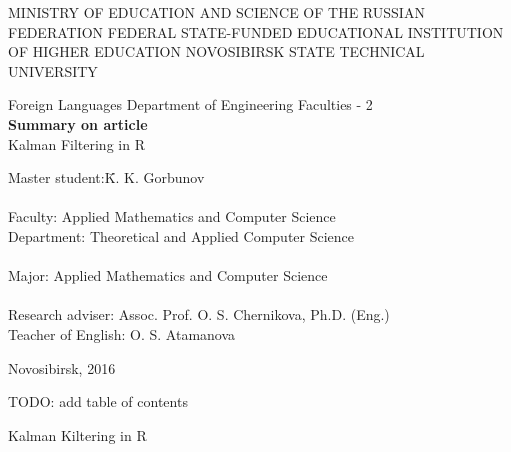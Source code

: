 \documentclass[a4paper,14pt]{extarticle}
\begin{document}
\setcounter{secnumdepth}{0}

\begin{titlepage}

	\begin{center}
		\MakeTextUppercase{ministry of education and science of the russian
			federation}
		\bigbreak
		\MakeTextUppercase{federal state-funded educational institution of higher
			education novosibirsk state technical university}
		
		\vspace{125pt}
		
		Foreign Languages Department of Engineering Faculties - 2 \\
		\vspace{100pt}
		\textbf{Summary on article} \\
		\smallbreak
		Kalman Filtering in R
		\vspace{75pt}
	\end{center}

	\begin{flushleft}
	\begin{tabbing}
	Master student:\quad\quad \= K. K. Gorbunov \\
	\\
	Faculty:          \> Applied Mathematics and Computer Science \\
	Department:       \> Theoretical and Applied Computer Science \\
	\\
	Major:            \> Applied Mathematics and Computer Science \\
	\\
	Research adviser: \> Assoc. Prof. O. S. Chernikova, Ph.D. (Eng.)
	\\
	Teacher of English: \> O. S. Atamanova
	\end{tabbing}
	\end{flushleft}

	\begin{center}
		\vspace{\fill}
		Novosibirsk, 2016
	\end{center}

\end{titlepage}

\newpage

TODO: add table of contents

\newpage

\begin{center}
	Kalman Kiltering in R
\end{center}
\end{document}
